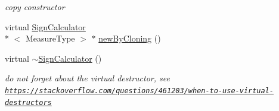 \begin{DoxyCompactItemize}
\begin{DoxyCompactList}\small\item\em copy constructor \end{DoxyCompactList}\item 
virtual \hyperlink{class_ox_1_1_sign_calculator}{Sign\-Calculator}\\*
$<$ Measure\-Type $>$ $\ast$ \hyperlink{class_ox_1_1_sign_calculator_aaf05d957c2f3cf68e71224562bb053d8}{new\-By\-Cloning} ()
\item 
\hypertarget{class_ox_1_1_sign_calculator_a5143a172e360633d8df758756d146889}{virtual \hyperlink{class_ox_1_1_sign_calculator_a5143a172e360633d8df758756d146889}{$\sim$\-Sign\-Calculator} ()}\label{class_ox_1_1_sign_calculator_a5143a172e360633d8df758756d146889}

\begin{DoxyCompactList}\small\item\em do not forget about the virtual destructor, see \href{https://stackoverflow.com/questions/461203/when-to-use-virtual-destructors}{\tt https\-://stackoverflow.\-com/questions/461203/when-\/to-\/use-\/virtual-\/destructors} \end{DoxyCompactList}\end{DoxyCompactItemize}
